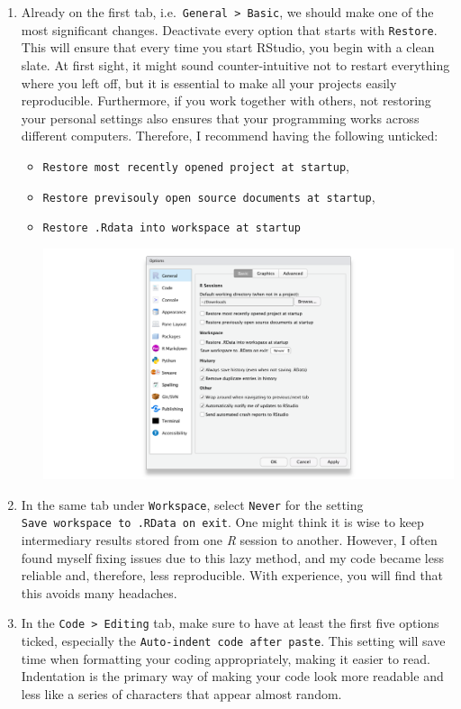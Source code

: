 \documentclass[
  letterpaper,
  DIV=11,
  numbers=noendperiod]{scrreprt}
\begin{document}
\begin{enumerate}
\def\labelenumi{\arabic{enumi}.}
\item
  Already on the first tab,
  i.e.~\texttt{General\ \textgreater{}\ Basic}, we should make one of
  the most significant changes. Deactivate every option that starts with
  \texttt{Restore}. This will ensure that every time you start RStudio,
  you begin with a clean slate. At first sight, it might sound
  counter-intuitive not to restart everything where you left off, but it
  is essential to make all your projects easily reproducible.
  Furthermore, if you work together with others, not restoring your
  personal settings also ensures that your programming works across
  different computers. Therefore, I recommend having the following
  unticked:

  \begin{itemize}
  \item
    \texttt{Restore\ most\ recently\ opened\ project\ at\ startup},
  \item
    \texttt{Restore\ previsouly\ open\ source\ documents\ at\ startup},
  \item
    \texttt{Restore\ .Rdata\ into\ workspace\ at\ startup}

    \includegraphics{images/chapter_03_img/rstudio_preferences/00_rstudio_preferences_basic.png}
  \end{itemize}
\item
  In the same tab under \texttt{Workspace}, select \texttt{Never} for
  the setting \texttt{Save\ workspace\ to\ .RData\ on\ exit}. One might
  think it is wise to keep intermediary results stored from one \emph{R}
  session to another. However, I often found myself fixing issues due to
  this lazy method, and my code became less reliable and, therefore,
  less reproducible. With experience, you will find that this avoids
  many headaches.
\item
  In the \texttt{Code\ \textgreater{}\ Editing} tab, make sure to have
  at least the first five options ticked, especially the
  \texttt{Auto-indent\ code\ after\ paste}. This setting will save time
  when formatting your coding appropriately, making it easier to read.
  Indentation is the primary way of making your code look more readable
  and less like a series of characters that appear almost random.


\end{enumerate}
\end{document}
